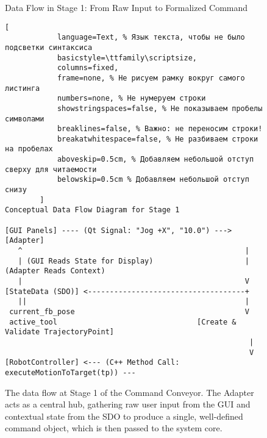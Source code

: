 \begin{figure}[htbp!] %
    \centering
    \begin{infobox}{Data Flow in Stage 1: From Raw Input to Formalized Command} %
        \begin{lstlisting}[
            language=Text, % Язык текста, чтобы не было подсветки синтаксиса
            basicstyle=\ttfamily\scriptsize,
            columns=fixed,
            frame=none, % Не рисуем рамку вокруг самого листинга
            numbers=none, % Не нумеруем строки
            showstringspaces=false, % Не показываем пробелы символами
            breaklines=false, % Важно: не переносим строки!
            breakatwhitespace=false, % Не разбиваем строки на пробелах
            aboveskip=0.5cm, % Добавляем небольшой отступ сверху для читаемости
            belowskip=0.5cm % Добавляем небольшой отступ снизу
        ]
Conceptual Data Flow Diagram for Stage 1

[GUI Panels] ---- (Qt Signal: "Jog +X", "10.0") ---> [Adapter]
   ^                                                   |
   | (GUI Reads State for Display)                     | (Adapter Reads Context)
   |                                                   V
[StateData (SDO)] <------------------------------------+
   ||                                                  |
 current_fb_pose                                       V
 active_tool                                [Create & Validate TrajectoryPoint]
                                                        |
                                                        V
[RobotController] <--- (C++ Method Call: executeMotionToTarget(tp)) ---
\end{lstlisting}
    \end{infobox}
    \caption{The data flow at Stage 1 of the Command Conveyor. The Adapter acts as a central hub, gathering raw user input from the GUI and contextual state from the SDO to produce a single, well-defined  command object, which is then passed to the system core.}
    \label{fig:stage1_data_flow}
\end{figure}


